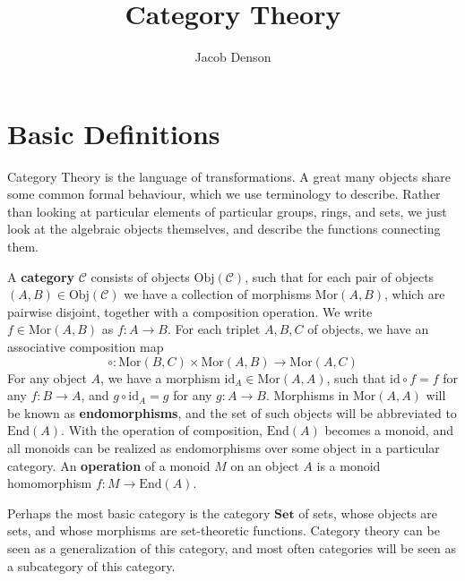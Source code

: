 

\title{Category Theory}
\author{Jacob Denson}



\maketitle
\tableofcontents

\chapter{Basic Definitions}


Category Theory is the language of transformations. A great many objects share some common formal behaviour, which we use terminology to describe. Rather than looking at particular elements of particular groups, rings, and sets, we just look at the algebraic objects themselves, and describe the functions connecting them.

A {\bf category} $\mathcal{C}$ consists of objects $\text{Obj}(\mathcal{C})$, such that for each pair of objects $(A,B) \in \text{Obj}(\mathcal{C})$ we have a collection of morphisms $\text{Mor}(A,B)$, which are pairwise disjoint, together with a composition operation. We write $f \in \text{Mor}(A,B)$ as $f:A \to B$. For each triplet $A,B,C$ of objects, we have an associative composition map
%
\[ \circ: \text{Mor}(B,C) \times \text{Mor}(A,B) \to \text{Mor}(A,C) \]
%
For any object $A$, we have a morphism $\text{id}_A \in \text{Mor}(A,A)$, such that $\text{id} \circ f = f$ for any $f: B \to A$, and $g \circ \text{id}_A = g$ for any $g: A \to B$. Morphisms in $\text{Mor}(A,A)$ will be known as {\bf endomorphisms}, and the set of such objects will be abbreviated to $\text{End}(A)$. With the operation of composition, $\text{End}(A)$ becomes a monoid, and all monoids can be realized as endomorphisms over some object in a particular category. An {\bf operation} of a monoid $M$ on an object $A$ is a monoid homomorphism $f: M \to \text{End}(A)$.

\begin{example}
    Perhaps the most basic category is the category $\mathbf{Set}$ of sets, whose objects are sets, and whose morphisms are set-theoretic functions. Category theory can be seen as a generalization of this category, and most often categories will be seen as a subcategory of this category.
\end{example}

